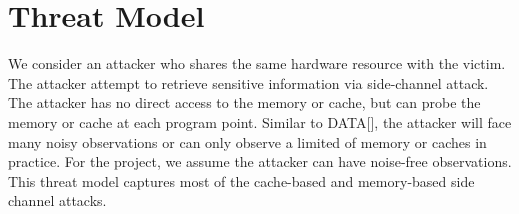 \section{Threat Model}
We consider an attacker who shares the same hardware resource with the victim. The attacker attempt to retrieve sensitive information via side-channel attack. The attacker has no direct access to the memory or cache, but can probe the memory or cache at each program point. Similar to DATA[], the attacker will face many noisy observations or can only observe a limited of memory or caches in practice. For the project, we assume the attacker can have noise-free observations. This threat model captures most of the cache-based and memory-based side channel attacks.

